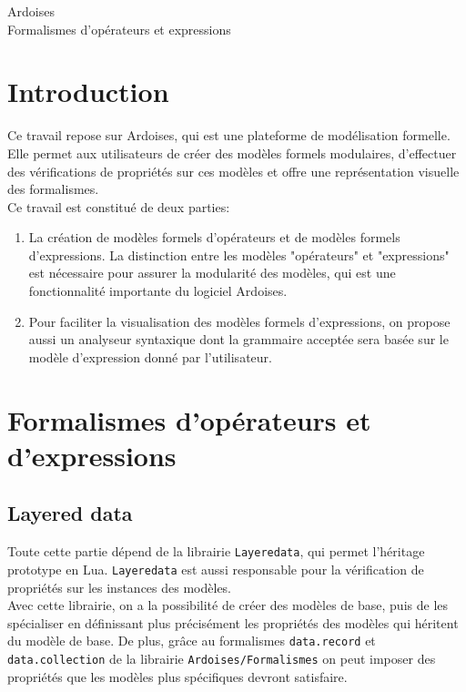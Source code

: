 \documentclass{article}
\begin{document}
\begin{center}
	\huge 
	Ardoises \\
	Formalismes d'opérateurs et expressions
\end{center}
\renewcommand{\contentsname}{Sommaire}
\tableofcontents
\newpage

\section{Introduction}
Ce travail repose sur Ardoises, %
qui est une plateforme de modélisation formelle. Elle permet aux utilisateurs de créer des modèles formels modulaires, d'effectuer des vérifications de propriétés sur ces modèles et offre une représentation visuelle des formalismes. \\

Ce travail est constitué de deux parties:
\begin{enumerate}
	\item La création de modèles formels d'opérateurs et de modèles formels d'expressions. La distinction entre les modèles "opérateurs" et "expressions" est nécessaire pour assurer la modularité des modèles, qui est une fonctionnalité importante du logiciel Ardoises.
	\item Pour faciliter la visualisation des modèles formels d'expressions, on propose aussi un analyseur syntaxique dont la grammaire acceptée sera basée sur le modèle d'expression donné par l'utilisateur.
\end{enumerate}

\section{Formalismes d'opérateurs et d'expressions}

\subsection{Layered data}
Toute cette partie dépend de la librairie \lstinline|Layeredata|, %
qui permet l'héritage prototype en Lua. \lstinline|Layeredata| est aussi responsable pour la vérification de propriétés sur les instances des modèles. \\

\noindent Avec cette librairie, on a la possibilité de créer des modèles de base, puis de les spécialiser en définissant plus précisément les propriétés des modèles qui héritent du modèle de base. De plus, grâce au formalismes \lstinline|data.record| et \lstinline|data.collection| de la librairie \lstinline|Ardoises/Formalismes| on peut imposer des propriétés que les modèles plus spécifiques devront satisfaire.
\end{document}
